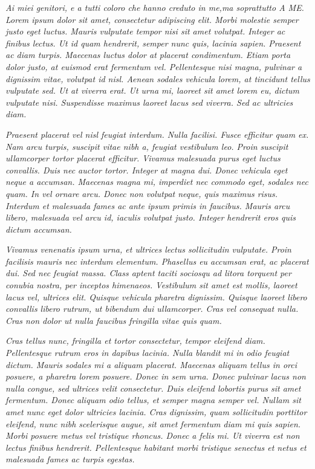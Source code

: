 \textit{Ai miei genitori,  e a tutti coloro che hanno creduto in me,ma soprattutto A ME.
Lorem ipsum dolor sit amet, consectetur adipiscing elit. Morbi molestie semper justo eget luctus. Mauris vulputate tempor nisi sit amet volutpat. Integer ac finibus lectus. Ut id quam hendrerit, semper nunc quis, lacinia sapien. Praesent ac diam turpis. Maecenas luctus dolor at placerat condimentum. Etiam porta dolor justo, at euismod erat fermentum vel. Pellentesque nisi magna, pulvinar a dignissim vitae, volutpat id nisl. Aenean sodales vehicula lorem, at tincidunt tellus vulputate sed. Ut at viverra erat. Ut urna mi, laoreet sit amet lorem eu, dictum vulputate nisi. Suspendisse maximus laoreet lacus sed viverra. Sed ac ultricies diam.}

\textit{Praesent placerat vel nisl feugiat interdum. Nulla facilisi. Fusce efficitur quam ex. Nam arcu turpis, suscipit vitae nibh a, feugiat vestibulum leo. Proin suscipit ullamcorper tortor placerat efficitur. Vivamus malesuada purus eget luctus convallis. Duis nec auctor tortor. Integer at magna dui. Donec vehicula eget neque a accumsan. Maecenas magna mi, imperdiet nec commodo eget, sodales nec quam. In vel ornare arcu. Donec non volutpat neque, quis maximus risus. Interdum et malesuada fames ac ante ipsum primis in faucibus. Mauris arcu libero, malesuada vel arcu id, iaculis volutpat justo. Integer hendrerit eros quis dictum accumsan.}

\textit{Vivamus venenatis ipsum urna, et ultrices lectus sollicitudin vulputate. Proin facilisis mauris nec interdum elementum. Phasellus eu accumsan erat, ac placerat dui. Sed nec feugiat massa. Class aptent taciti sociosqu ad litora torquent per conubia nostra, per inceptos himenaeos. Vestibulum sit amet est mollis, laoreet lacus vel, ultrices elit. Quisque vehicula pharetra dignissim. Quisque laoreet libero convallis libero rutrum, ut bibendum dui ullamcorper. Cras vel consequat nulla. Cras non dolor ut nulla faucibus fringilla vitae quis quam.}

\textit{Cras tellus nunc, fringilla et tortor consectetur, tempor eleifend diam. Pellentesque rutrum eros in dapibus lacinia. Nulla blandit mi in odio feugiat dictum. Mauris sodales mi a aliquam placerat. Maecenas aliquam tellus in orci posuere, a pharetra lorem posuere. Donec in sem urna. Donec pulvinar lacus non nulla congue, sed ultrices velit consectetur. Duis eleifend lobortis purus sit amet fermentum. Donec aliquam odio tellus, et semper magna semper vel. Nullam sit amet nunc eget dolor ultricies lacinia. Cras dignissim, quam sollicitudin porttitor eleifend, nunc nibh scelerisque augue, sit amet fermentum diam mi quis sapien. Morbi posuere metus vel tristique rhoncus. Donec a felis mi. Ut viverra est non lectus finibus hendrerit. Pellentesque habitant morbi tristique senectus et netus et malesuada fames ac turpis egestas.}

